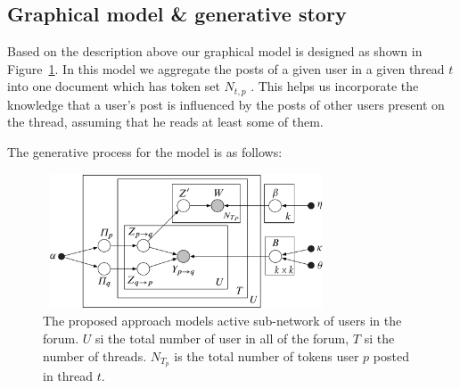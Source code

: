 \documentclass{sig-alternate}
\begin{document}
\subsection{Graphical model \& generative story}
\label{sec:gen-story}
Based on the description above our graphical model is designed as shown
in Figure~\ref{fig:finalThreadAggregationModel}. In this model
we aggregate the posts of 
a given user in a given thread $t$ into one document which has token
set $N_{t,p}$ . This helps us incorporate the knowledge that a user's post is
influenced by the posts of other users present on the thread, assuming that
he reads at least some of them.

The generative process for the model is as follows:

\begin{figure}
\centering
\includegraphics[height=4cm,width=8.5cm]{model.pdf}
\caption{The proposed approach models active sub-network of users in the forum.
$U$ si the total number of user in all of the forum, $T$ si the number of
threads. $N_{T_p}$ is the total number of tokens user $p$ posted in thread $t$.
}
\label{fig:finalThreadAggregationModel}
\end{figure}
\end{document}
